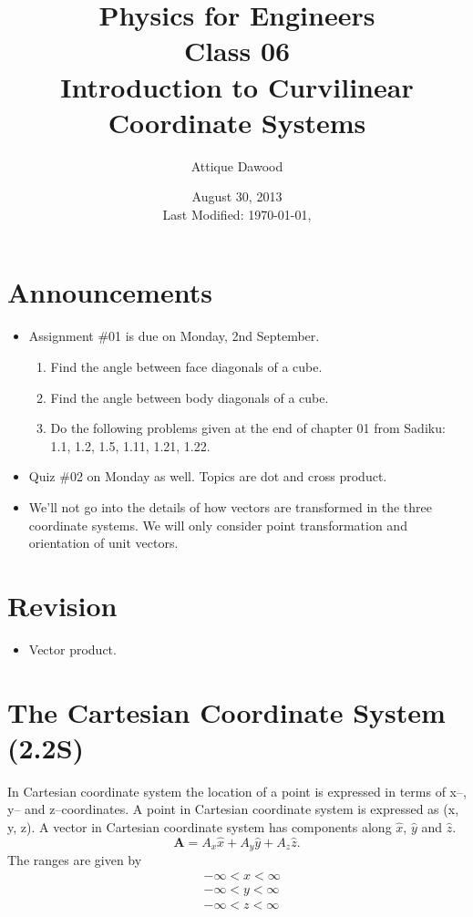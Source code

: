 \documentclass[12pt,a4paper]{article}
\title{\vspace{-2cm}Physics for Engineers\\Class 06\\Introduction to Curvilinear Coordinate Systems}
\author{Attique Dawood}
\date{August 30, 2013\\[0.2cm] Last Modified: \today, \currenttime}
\begin{document}
\maketitle
\section{Announcements}
\begin{itemize}
\item Assignment \#01 is due on Monday, 2nd September.
\begin{enumerate}
\item Find the angle between face diagonals of a cube.
\item Find the angle between body diagonals of a cube.
\item Do the following problems given at the end of chapter 01 from Sadiku: 1.1, 1.2, 1.5, 1.11, 1.21, 1.22.
\end{enumerate}
\item Quiz \#02 on Monday as well. Topics are dot and cross product.
\item We'll not go into the details of how vectors are transformed in the three coordinate systems. We will only consider point transformation and orientation of unit vectors.
\end{itemize}
\section{Revision}
\begin{itemize}
\item Vector product.
\end{itemize}
\section{The Cartesian Coordinate System (2.2S)}
In Cartesian coordinate system the location of a point is expressed in terms of x--, y-- and z--coordinates. A point in Cartesian coordinate system is expressed as (x, y, z). A vector in Cartesian coordinate system has components along $\hat x$, $\hat y$ and $\hat z$.
\begin{equation}
\textbf{A}=A_x\hat x+A_y\hat y+ A_z\hat z.
\end{equation}
The ranges are given by
\begin{equation*}
\begin{split}
&-\infty < x < \infty\\
&-\infty < y < \infty\\
&-\infty < z < \infty\\
\end{split}
\end{equation*}
\end{document}
